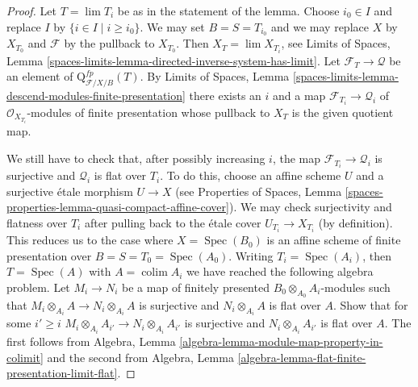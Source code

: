 \documentclass{stacks-project}
\theoremstyle{plain}
\theoremstyle{definition}
\theoremstyle{remark}
\numberwithin{equation}{subsection}
\def\lim{\mathop{\mathrm{lim}}\nolimits}
\def\colim{\mathop{\mathrm{colim}}\nolimits}
\def\Spec{\mathop{\mathrm{Spec}}}
\begin{document}
\begin{proof}
Let $T = \lim T_i$ be as in the statement of the lemma.
Choose $i_0 \in I$ and replace $I$ by $\{i \in I \mid i \geq i_0\}$.
We may set $B = S = T_{i_0}$ and we may replace $X$ by $X_{T_0}$
and $\mathcal{F}$ by the pullback to $X_{T_0}$. Then
$X_T = \lim X_{T_i}$, see
Limits of Spaces, Lemma
\ref{spaces-limits-lemma-directed-inverse-system-has-limit}.
Let $\mathcal{F}_T \to \mathcal{Q}$ be an element of
$\text{Q}^{fp}_{\mathcal{F}/X/B}(T)$. By
Limits of Spaces, Lemma
\ref{spaces-limits-lemma-descend-modules-finite-presentation}
there exists an $i$ and a map $\mathcal{F}_{T_i} \to \mathcal{Q}_i$
of $\mathcal{O}_{X_{T_i}}$-modules of finite presentation whose
pullback to $X_T$ is the given quotient map.

\medskip\noindent
We still have to check that, after possibly increasing $i$, the map
$\mathcal{F}_{T_i} \to \mathcal{Q}_i$ is surjective and $\mathcal{Q}_i$
is flat over $T_i$. To do this, choose an affine scheme $U$ and a
surjective \'etale morphism $U \to X$ (see Properties of Spaces,
Lemma \ref{spaces-properties-lemma-quasi-compact-affine-cover}).
We may check surjectivity and flatness over $T_i$ after pulling
back to the \'etale cover $U_{T_i} \to X_{T_i}$ (by definition).
This reduces us to the case where $X = \Spec(B_0)$ is an affine scheme of
finite presentation over $B = S = T_0 = \Spec(A_0)$.
Writing $T_i = \Spec(A_i)$, then $T = \Spec(A)$ with $A = \colim A_i$
we have reached the following algebra problem. Let $M_i \to N_i$
be a map of finitely presented $B_0 \otimes_{A_0} A_i$-modules
such that $M_i \otimes_{A_i} A \to N_i \otimes_{A_i} A$ is surjective
and $N_i \otimes_{A_i} A$ is flat over $A$. Show that for some $i' \geq i$
$M_i \otimes_{A_i} A_{i'} \to N_i \otimes_{A_i} A_{i'}$ is surjective
and $N_i \otimes_{A_i} A_{i'}$ is flat over $A$.
The first follows from
Algebra, Lemma \ref{algebra-lemma-module-map-property-in-colimit}
and the second from
Algebra, Lemma \ref{algebra-lemma-flat-finite-presentation-limit-flat}.
\end{proof}
\end{document}
